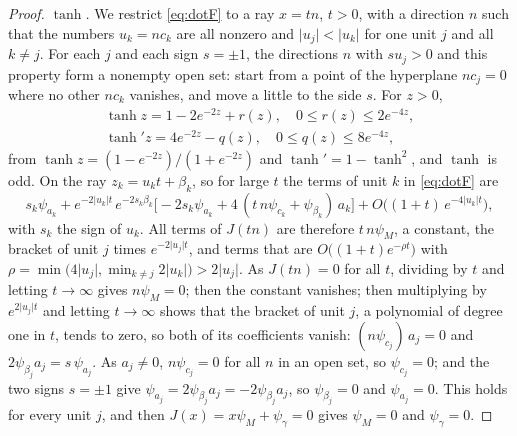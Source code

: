 \documentclass[10pt]{article}
\theoremstyle{definition}
\theoremstyle{remark}
\begin{document}
\begin{proof}
\emph{$\tanh$.} We restrict \cref{eq:dotF} to a ray $x = tn$, $t > 0$, with a direction $n$ such that the numbers $u_k = nc_k$ are all nonzero and $\lvert u_j\rvert < \lvert u_k\rvert$ for one unit $j$ and all $k \neq j$. For each $j$ and each sign $s = \pm 1$, the directions $n$ with $su_j > 0$ and this property form a nonempty open set: start from a point of the hyperplane $nc_j = 0$ where no other $nc_k$ vanishes, and move a little to the side $s$. For $z > 0$,
\begin{gather*}
\tanh z = 1 - 2e^{-2z} + r(z),\quad 0 \le r(z) \le 2e^{-4z},\\
\tanh' z = 4e^{-2z} - q(z),\quad 0 \le q(z) \le 8e^{-4z},
\end{gather*}
from $\tanh z = (1 - e^{-2z})/(1 + e^{-2z})$ and $\tanh' = 1 - \tanh^2$, and $\tanh$ is odd. On the ray $z_k = u_kt + \beta_k$, so for large $t$ the terms of unit $k$ in \cref{eq:dotF} are
\[
s_k\psi_{a_k} + e^{-2\lvert u_k\rvert t}\,e^{-2s_k\beta_k}\big[-2s_k\psi_{a_k} + 4\,(t\,n\psi_{c_k} + \psi_{\beta_k})\,a_k\big] + O\big((1+t)\,e^{-4\lvert u_k\rvert t}\big),
\]
with $s_k$ the sign of $u_k$. All terms of $J(tn)$ are therefore $t\,n\psi_M$, a constant, the bracket of unit $j$ times $e^{-2\lvert u_j\rvert t}$, and terms that are $O\big((1+t)e^{-\rho t}\big)$ with $\rho = \min\big(4\lvert u_j\rvert, \min_{k\neq j}2\lvert u_k\rvert\big) > 2\lvert u_j\rvert$. As $J(tn) = 0$ for all $t$, dividing by $t$ and letting $t \to \infty$ gives $n\psi_M = 0$; then the constant vanishes; then multiplying by $e^{2\lvert u_j\rvert t}$ and letting $t \to \infty$ shows that the bracket of unit $j$, a polynomial of degree one in $t$, tends to zero, so both of its coefficients vanish: $(n\psi_{c_j})\,a_j = 0$ and $2\psi_{\beta_j}a_j = s\,\psi_{a_j}$. As $a_j \neq 0$, $n\psi_{c_j} = 0$ for all $n$ in an open set, so $\psi_{c_j} = 0$; and the two signs $s = \pm1$ give $\psi_{a_j} = 2\psi_{\beta_j}a_j = -2\psi_{\beta_j}a_j$, so $\psi_{\beta_j} = 0$ and $\psi_{a_j} = 0$. This holds for every unit $j$, and then $J(x) = x\psi_M + \psi_\gamma = 0$ gives $\psi_M = 0$ and $\psi_\gamma = 0$.


\end{proof}
\end{document}
